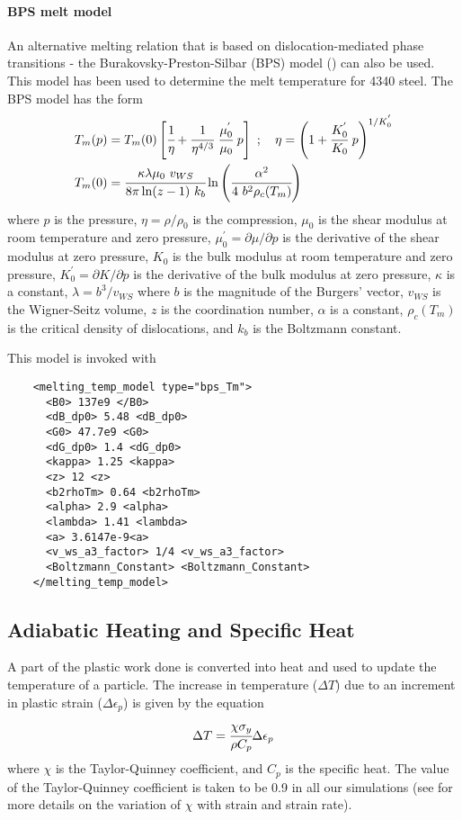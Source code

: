   \paragraph{BPS melt model}
  An alternative melting relation that is based on dislocation-mediated
  phase transitions - the Burakovsky-Preston-Silbar (BPS) model
  (\cite{Burakovsky2000}) can also be used.  This model has been used to 
  determine the melt temperature for 4340 steel.  The BPS model has the form
  \begin{align}
    T_m(p) & = T_m(0)
      \left[\cfrac{1}{\eta} + 
            \cfrac{1}{\eta^{4/3}}~\cfrac{\mu_0^{'}}{\mu_0}~p\right]~; 
    \quad
    \eta = \left(1 + \cfrac{K_0^{'}}{K_0}~p\right)^{1/K_0^{'}} 
    \label{eq:TmBPS}\\
    T_m(0) & = \cfrac{\kappa\lambda\mu_0~v_{WS}}{8\pi\ln(z-1)~k_b}
               \ln\left(\cfrac{\alpha^2}{4~b^2\rho_c(T_m)}\right)
  \end{align}
  where $p$ is the pressure, $\eta = \rho/\rho_0$ is the compression, 
  $\mu_0$ is the shear modulus at room temperature and zero pressure, 
  $\mu_0^{'} = \partial\mu/\partial p$ is the derivative of the shear modulus 
  at zero pressure, $K_0$ is the bulk modulus at room temperature and
  zero pressure, $K_0^{'} = \partial K/\partial p$ is the derivative of the 
  bulk modulus at zero pressure, $\kappa$ is a constant, $\lambda = b^3/v_{WS}$
  where $b$ is the magnitude of the Burgers' vector, $v_{WS}$ is the 
  Wigner-Seitz volume, $z$ is the coordination number, $\alpha$ is a 
  constant, $\rho_c(T_m)$ is the critical density of dislocations, and
  $k_b$ is the Boltzmann constant.

  This model is invoked with
  \lstset{language=XML}
  \begin{lstlisting}
    <melting_temp_model type="bps_Tm">
      <B0> 137e9 </B0>
      <dB_dp0> 5.48 <dB_dp0>
      <G0> 47.7e9 <G0>
      <dG_dp0> 1.4 <dG_dp0>
      <kappa> 1.25 <kappa>
      <z> 12 <z>
      <b2rhoTm> 0.64 <b2rhoTm>
      <alpha> 2.9 <alpha>
      <lambda> 1.41 <lambda>
      <a> 3.6147e-9<a>
      <v_ws_a3_factor> 1/4 <v_ws_a3_factor>
      <Boltzmann_Constant> <Boltzmann_Constant>
    </melting_temp_model>
  \end{lstlisting}

  \subsection{Adiabatic Heating and Specific Heat}
  A part of the plastic work done is converted into heat and used to update the 
  temperature of a particle.  The increase in temperature ($\Delta T$) due to 
  an increment in plastic strain ($\Delta\epsilon_p$) is given by the equation
  \begin{equation}
    \Delta T = \cfrac{\chi\sigma_y}{\rho C_p} \Delta \epsilon_p
  \end{equation}
  where $\chi$ is the Taylor-Quinney coefficient, and $C_p$ is the specific
  heat.  The value of the Taylor-Quinney coefficient is taken to be 0.9
  in all our simulations (see \cite{Ravi2001} for more details on the 
  variation of $\chi$ with strain and strain rate).

